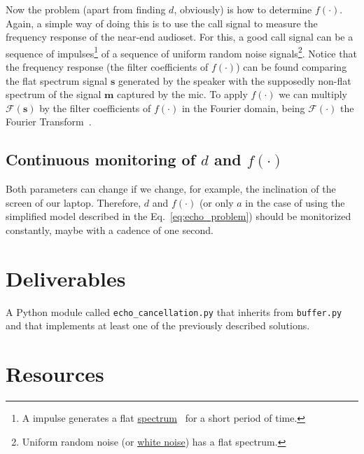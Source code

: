 Now the problem (apart from finding $d$, obviously) is how to
determine $f(\cdot)$. Again, a simple way of doing this is to use the
call signal to measure the frequency response of the near-end
audioset. For this, a good call signal can be a sequence of
impulses\footnote{A impulse generates a flat
  \href{https://en.wikipedia.org/wiki/Spectral_density}{spectrum}~\cite{kovacevic2013fourier,Oppenheim2}
  for a short period of time.} of a sequence of uniform random noise
signals\footnote{Uniform random noise (or
  \href{https://en.wikipedia.org/wiki/White_noise}{white noise}) has a
  flat spectrum.}. Notice that the frequency response (the filter
coefficients of $f(\cdot)$) can be found comparing the flat spectrum
signal ${\mathbf s}$ generated by the speaker with the supposedly
non-flat spectrum of the signal ${\mathbf m}$ captured by the mic.  To
apply $f(\cdot)$ we can multiply ${\mathcal F}({\mathbf s})$ by the
filter coefficients of $f(\cdot)$ in the Fourier domain, being
${\mathcal F}(\cdot)$ the Fourier Transform~\cite{kovacevic2013fourier,Oppenheim2}.

\subsection{Continuous monitoring of $d$ and $f(\cdot)$}

Both parameters can change if we change, for example, the inclination
of the screen of our laptop. Therefore, $d$ and $f(\cdot)$ (or only
$a$ in the case of using the simplified model described in the
Eq.~\eqref{eq:echo_problem}) should be monitorized constantly, maybe
with a cadence of one second.

\section{Deliverables}

A Python module called \texttt{echo\_cancellation.py} that inherits from
\texttt{buffer.py} and that implements at least one of the previously
described solutions.

\section{Resources}



\begin{comment}
http://www.seas.ucla.edu/dsplab/index.html
https://es.mathworks.com/help/signal/ug/echo-cancelation.html
https://dsp.stackexchange.com/questions/26617/echo-cancelling-using-autocorrelation-function
https://pypi.org/project/adaptfilt/
http://www.diva-portal.org/smash/get/diva2:280596/fulltext01
https://github.com/ThomasHaubner/e2e_dnn_ad_control_for_lin_aec
https://scicoding.com/4-ways-of-calculating-autocorrelation-in-python/
\end{comment}